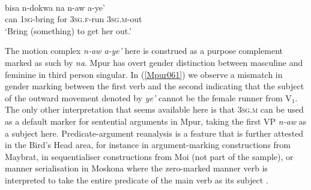 \ea \label{Mpur061}
\\
\gll bisa n-dokwa na n-aw a-ye' \\
can \textsc{1}\textsc{sg}-bring for \textsc{3}\textsc{sg}.\textsc{f}-run \textsc{3}\textsc{sg}.\textsc{m}-out \\
\glft `Bring (something) to get her out.'\\ 
\z

The motion complex \textit{n-aw a-ye'} here is construed as a purpose complement marked as such by \textit{na}. Mpur has overt gender distinction between masculine and feminine in third person singular. In (\ref{Mpur061}) we observe a mismatch in gender marking between the first verb and the second indicating that the subject of the outward movement denoted by \textit{ye'} cannot be the female runner from V$_{1}$. The only other interpretation that seems available here is that \textsc{3sg.m} can be used as a default marker for sentential arguments in Mpur, taking the first VP \textit{n-aw} as a subject here. Predicate-argument reanalysis is a feature that is further attested in the Bird's Head area, for instance in argument-marking constructions from Maybrat, in sequentialiser constructions from Moi (not part of the sample), or manner serialisation in Moskona where the zero-marked manner verb is interpreted to take the entire predicate of the main verb as its subject \citep[299f.]{gravelle2010grammar}. 

